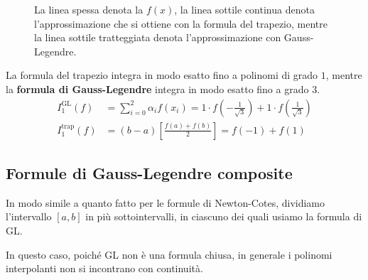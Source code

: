 \begin{figure}[ht]
	\caption{La linea spessa denota la $f( x)$, la linea sottile continua denota l'approssimazione che si ottiene con la formula del trapezio, mentre la linea sottile tratteggiata denota l'approssimazione con Gauss-Legendre.}
\end{figure}

La formula del trapezio integra in modo esatto fino a polinomi di grado $1$, mentre la \textbf{formula di Gauss-Legendre} integra in modo esatto fino a grado $3$.
\begin{align*}
I^{\text{GL}}_{1}( f) & =\sum\limits ^{2}_{i=0} \alpha _{i} f( x_{i}) =1\cdot f\left( -\frac{1}{\sqrt{3}}\right) +1\cdot f\left(\frac{1}{\sqrt{3}}\right)\\
I^{\text{trap}}_{1}( f) & =( b-a)\left[\frac{f( a) +f( b)}{2}\right] =f( -1) +f( 1)
\end{align*}

\subsection{Formule di Gauss-Legendre composite}
In modo simile a quanto fatto per le formule di Newton-Cotes, dividiamo l'intervallo $[a,b]$ in più sottointervalli, in ciascuno dei quali usiamo la formula di GL.

In questo caso, poiché GL non è una formula chiusa, in generale i polinomi interpolanti non si incontrano con continuità.

